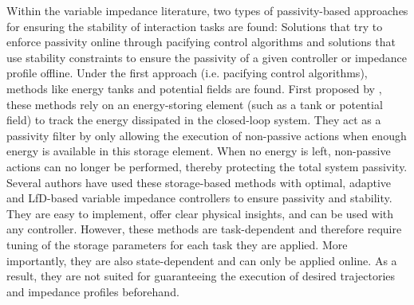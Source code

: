 Within the variable impedance literature, two types of passivity-based approaches for ensuring the stability of interaction tasks are found: Solutions that try to enforce passivity online through pacifying control algorithms and solutions that use stability constraints to ensure the passivity of a given controller or impedance profile offline. Under the first approach (i.e. pacifying control algorithms), methods like energy tanks and potential fields are found. First proposed by \cite{ferragutiTankbasedApproachImpedance2013}, these methods rely on an energy-storing element (such as a tank or potential field) to track the energy dissipated in the closed-loop system. They act as a passivity filter by only allowing the execution of non-passive actions when enough energy is available in this storage element. When no energy is left, non-passive actions can no longer be performed, thereby protecting the total system passivity. Several authors have used these storage-based methods with optimal, adaptive and LfD-based variable impedance controllers to ensure passivity and stability. They are easy to implement, offer clear physical insights, and can be used with any controller. However, these methods are task-dependent and therefore require tuning of the storage parameters for each task they are applied. More importantly, they are also state-dependent and can only be applied online. As a result, they are not suited for guaranteeing the execution of desired trajectories and impedance profiles beforehand. 
